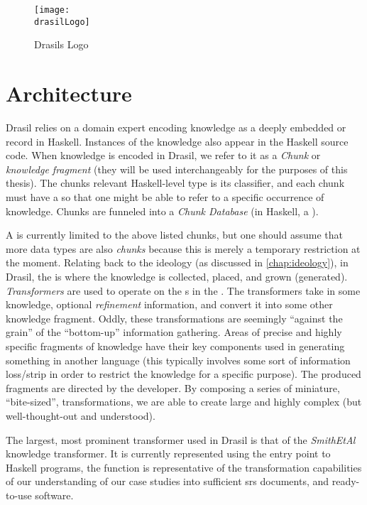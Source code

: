 \begin{figure}[H]
      \centering
      \caption{Drasils Logo}
      \label{fig:drasilLogo}
      \texttt{[image: \\drasilLogo]}
\end{figure}

\drasilPersonification

\section{Architecture}

Drasil relies on a domain expert encoding knowledge as a deeply embedded
 or record in Haskell. Instances of the knowledge also appear in the
Haskell source code. When knowledge is encoded in Drasil, we refer to it as a
\textit{Chunk} or \textit{knowledge fragment} (they will be used interchangeably
for the purposes of this thesis). The chunks relevant Haskell-level type is its
classifier, and each chunk must have a  so that one might be able to
refer to a specific occurrence of knowledge. Chunks are funneled into a
\textit{Chunk Database} (in Haskell, a \ChunkDB{}).


A \ChunkDB{} is currently limited to the above listed chunks, but one should assume that more data types are also
\textit{chunks} because this is merely a temporary restriction at the
moment. Relating back to the ideology (as discussed in
\autoref{chap:ideology}), in Drasil, the \ChunkDB{} is where the knowledge
is collected, placed, and grown (generated). \textit{Transformers} are
used to operate on the \Chunk{}s in the \ChunkDB{}. The transformers take
in some knowledge, optional \textit{refinement} information, and convert
it into some other knowledge fragment. Oddly,
these transformations are seemingly ``against the grain'' of the
``bottom-up'' information gathering. Areas of precise and highly specific
fragments of knowledge have their key components used in generating
something in another language (this typically involves some sort of
information loss/strip in order to restrict the knowledge for a specific
purpose). The produced fragments are directed by the developer. By
composing a series of miniature, ``bite-sized'', transformations, we are
able to create large and highly complex (but well-thought-out and
understood).

The largest, most prominent transformer used in Drasil is that of the
\textit{SmithEtAl} knowledge transformer. It is currently represented using the entry point to Haskell
programs, the  function is representative of the
transformation capabilities of our understanding of our case studies into
sufficient \acs{srs} documents, and ready-to-use software.

